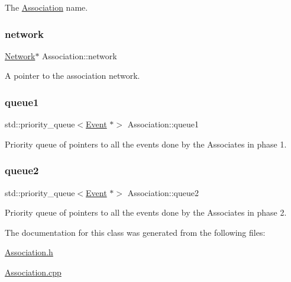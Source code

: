 The \mbox{\hyperlink{classAssociation}{Association}} name. 

\mbox{\label{classAssociation_a6747cedd4ce14a3b890c8ac87f676192}} 
\subsubsection{\texorpdfstring{network}{network}}
{\footnotesize\ttfamily \mbox{\hyperlink{classNetwork}{Network}}$\ast$ Association\+::network\hspace{0.3cm}{\ttfamily [private]}}



A pointer to the association network. 

\mbox{\label{classAssociation_a22ce7b1ee683ccc41ac9aa2864744349}} 
\subsubsection{\texorpdfstring{queue1}{queue1}}
{\footnotesize\ttfamily std\+::priority\+\_\+queue$<$\mbox{\hyperlink{classEvent}{Event}} $\ast$$>$ Association\+::queue1\hspace{0.3cm}{\ttfamily [private]}}



Priority queue of pointers to all the events done by the Associates in phase 1. 

\mbox{\label{classAssociation_ab67c6667f1fda8a6c97e7a7f2c79be2f}} 
\subsubsection{\texorpdfstring{queue2}{queue2}}
{\footnotesize\ttfamily std\+::priority\+\_\+queue$<$\mbox{\hyperlink{classEvent}{Event}} $\ast$$>$ Association\+::queue2\hspace{0.3cm}{\ttfamily [private]}}



Priority queue of pointers to all the events done by the Associates in phase 2. 



The documentation for this class was generated from the following files\+:\begin{DoxyCompactItemize}
\item 
\mbox{\hyperlink{Association_8h}{Association.\+h}}\item 
\mbox{\hyperlink{Association_8cpp}{Association.\+cpp}}\end{DoxyCompactItemize}
